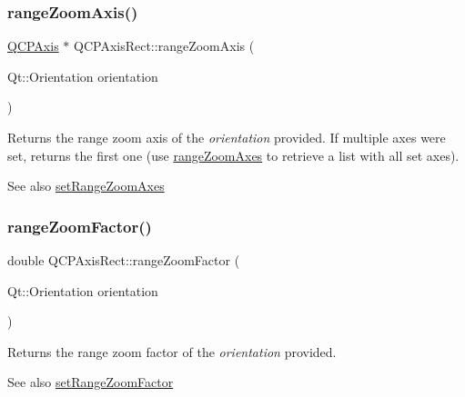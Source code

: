 \subsubsection{\texorpdfstring{range\+Zoom\+Axis()}{rangeZoomAxis()}}
{\footnotesize\ttfamily \mbox{\hyperlink{class_q_c_p_axis}{Q\+C\+P\+Axis}} $\ast$ Q\+C\+P\+Axis\+Rect\+::range\+Zoom\+Axis (\begin{DoxyParamCaption}\item[{Qt\+::\+Orientation}]{orientation }\end{DoxyParamCaption})}

Returns the range zoom axis of the {\itshape orientation} provided. If multiple axes were set, returns the first one (use \mbox{\hyperlink{class_q_c_p_axis_rect_a86aac0f435f209d60dacd22cda10c104}{range\+Zoom\+Axes}} to retrieve a list with all set axes).

\begin{DoxySeeAlso}{See also}
\mbox{\hyperlink{class_q_c_p_axis_rect_a9442cca2aa358405f39a64d51eca13d2}{set\+Range\+Zoom\+Axes}} 
\end{DoxySeeAlso}
\mbox{\label{class_q_c_p_axis_rect_ae4e6c4d143aacc88d2d3c56f117c2fe1}} 
\subsubsection{\texorpdfstring{range\+Zoom\+Factor()}{rangeZoomFactor()}}
{\footnotesize\ttfamily double Q\+C\+P\+Axis\+Rect\+::range\+Zoom\+Factor (\begin{DoxyParamCaption}\item[{Qt\+::\+Orientation}]{orientation }\end{DoxyParamCaption})}

Returns the range zoom factor of the {\itshape orientation} provided.

\begin{DoxySeeAlso}{See also}
\mbox{\hyperlink{class_q_c_p_axis_rect_a895d7ac745ea614e04056244b3c138ac}{set\+Range\+Zoom\+Factor}} 
\end{DoxySeeAlso}
\mbox{\label{class_q_c_p_axis_rect_a03c39cd9704f0d36fb6cf980cdddcbaa}} 
